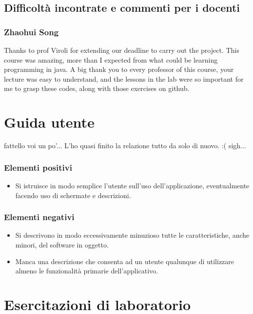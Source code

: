 \documentclass[a4paper,12pt]{report}
\begin{document}
\section{Difficoltà incontrate e commenti per i docenti}
\subsection*{Zhaohui Song}
Thanks to prof Viroli for extending our deadline to carry out the project.
%
This course was amazing, more than I expected from what could be learning programming in java. 
%
A big thank you to every professor of this course, your lecture was easy to understand, and the lessons in the lab were so important for me to grasp these codes, along with those exercises on github.

\appendix
\chapter{Guida utente}

fattello voi un po'... L'ho quasi finito la relazione tutto da solo di nuovo. :( sigh...

\subsection*{Elementi positivi}

\begin{itemize}
 \item Si istruisce in modo semplice l'utente sull'uso dell'applicazione, eventualmente facendo uso di schermate e descrizioni.
\end{itemize}

\subsection*{Elementi negativi}
\begin{itemize}
 \item Si descrivono in modo eccessivamente minuzioso tutte le caratteristiche, anche minori, del software in oggetto.
 \item Manca una descrizione che consenta ad un utente qualunque di utilizzare almeno le funzionalità primarie dell'applicativo.
\end{itemize}

\chapter{Esercitazioni di laboratorio}
\end{document}
